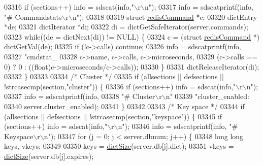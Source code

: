 \begin{DoxyCode}
{{{{{{{{{{{{{{{{{{{{{{{{{{{{{{{{{{{{{{{{{{{{{{{{{{{{{{{{{{{{{{{{{{{{{{{{{{{{{{{{{{{{{{{{{{{{{{{{{{{{{{{{{{{{{{{{{{{{{{{{{{{{{{{{{{{{{{{{{{{{{{{{{{{{{{{{{{{{{{{{{{{{{{03316         \textcolor{keywordflow}{if} (sections++) info = sdscat(info,\textcolor{stringliteral}{"\(\backslash\)r\(\backslash\)n"});
03317         info = sdscatprintf(info, \textcolor{stringliteral}{"# Commandstats\(\backslash\)r\(\backslash\)n"});
03318 
03319         \textcolor{keyword}{struct} \hyperlink{structredisCommand}{redisCommand} *c;
03320         dictEntry *de;
03321         dictIterator *di;
03322         di = dictGetSafeIterator(server.commands);
03323         \textcolor{keywordflow}{while}((de = dictNext(di)) != NULL) \{
03324             c = (\textcolor{keyword}{struct} \hyperlink{structredisCommand}{redisCommand} *) \hyperlink{dict_8h_ae8d2cc391873b2bea2b87c4f80f43120}{dictGetVal}(de);
03325             \textcolor{keywordflow}{if} (!c->calls) \textcolor{keywordflow}{continue};
03326             info = sdscatprintf(info,
03327                 \textcolor{stringliteral}{"cmdstat\_%
03328                 c->name, c->calls, c->microseconds,
03329                 (c->calls == 0) ? 0 : ((\textcolor{keywordtype}{float})c->microseconds/c->calls));
03330         \}
03331         dictReleaseIterator(di);
03332     \}
03333 
03334     \textcolor{comment}{/* Cluster */}
03335     \textcolor{keywordflow}{if} (allsections || defsections || !strcasecmp(section,\textcolor{stringliteral}{"cluster"})) \{
03336         \textcolor{keywordflow}{if} (sections++) info = sdscat(info,\textcolor{stringliteral}{"\(\backslash\)r\(\backslash\)n"});
03337         info = sdscatprintf(info,
03338         \textcolor{stringliteral}{"# Cluster\(\backslash\)r\(\backslash\)n"}
03339         \textcolor{stringliteral}{"cluster\_enabled:%
03340         server.cluster\_enabled);
03341     \}
03342 
03343     \textcolor{comment}{/* Key space */}
03344     \textcolor{keywordflow}{if} (allsections || defsections || !strcasecmp(section,\textcolor{stringliteral}{"keyspace"})) \{
03345         \textcolor{keywordflow}{if} (sections++) info = sdscat(info,\textcolor{stringliteral}{"\(\backslash\)r\(\backslash\)n"});
03346         info = sdscatprintf(info, \textcolor{stringliteral}{"# Keyspace\(\backslash\)r\(\backslash\)n"});
03347         \textcolor{keywordflow}{for} (j = 0; j < server.dbnum; j++) \{
03348             \textcolor{keywordtype}{long} \textcolor{keywordtype}{long} keys, vkeys;
03349 
03350             keys = \hyperlink{dict_8h_af193430dd3d5579a52b194512f72c1f0}{dictSize}(server.db[j].dict);
03351             vkeys = \hyperlink{dict_8h_af193430dd3d5579a52b194512f72c1f0}{dictSize}(server.db[j].expires);
}}}}}}}}}}}}}}}}}}}}}}}}}}}}}}}}}}}}}}}}}}}}}}}}}}}}}}}}}}}}}}}}}}}}}}}}}}}}}}}}}}}}}}}}}}}}}}}}}}}}}}}}}}}}}}}}}}}}}}}}}}}}}}}}}}}}}}}}}}}}}}}}}}}}}}}}}}}}}}}}}}}}}}}}
\end{DoxyCode}
